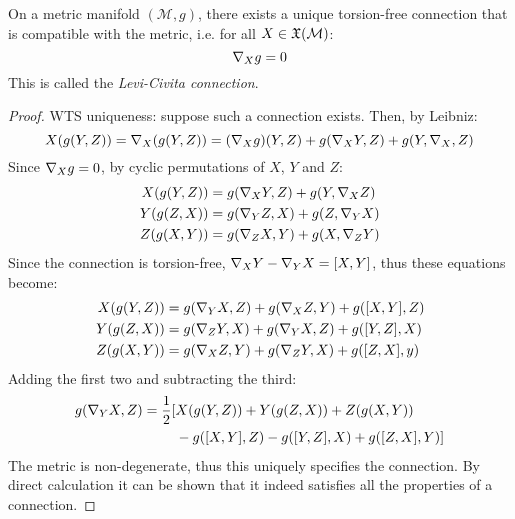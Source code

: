 \begin{theorem}[Riemann]
  On a metric manifold $ (\mathcal{M},g) $, there exists a unique torsion-free connection that is compatible with the metric, i.e. for all $ X \in \mathfrak{X}(\mathcal{M}) $:
  \begin{equation}
    \nabla_X g = 0
    \label{eq:3.39}
  \end{equation}
  This is called the \textit{Levi-Civita connection}.
\end{theorem}
\begin{proof}
  WTS uniqueness: suppose such a connection exists. Then, by Leibniz:
  \begin{equation*}
    X(g(Y,Z)) = \nabla_X (g(Y,Z)) = (\nabla_X g)(Y,Z) + g(\nabla_X Y, Z) + g(Y, \nabla_X, Z)
  \end{equation*}
  Since $ \nabla_X g = 0 $, by cyclic permutations of $ X $, $ Y $ and $ Z $:
  \begin{equation*}
    \begin{split}
      X(g(Y,Z)) &= g(\nabla_X Y, Z) + g(Y, \nabla_X Z) \\
      Y(g(Z,X)) &= g(\nabla_Y Z, X) + g(Z, \nabla_Y X) \\
      Z(g(X,Y)) &= g(\nabla_Z X, Y) + g(X, \nabla_Z Y)
    \end{split}
  \end{equation*}
  Since the connection is torsion-free, $ \nabla_X Y - \nabla_Y X = [X,Y] $, thus these equations become:
  \begin{equation*}
    \begin{split}
      X(g(Y,Z)) &= g(\nabla_Y X, Z) + g(\nabla_X Z, Y) + g([X,Y], Z) \\
      Y(g(Z,X)) &= g(\nabla_Z Y, X) + g(\nabla_Y X, Z) + g([Y,Z], X) \\
      Z(g(X,Y)) &= g(\nabla_X Z, Y) + g(\nabla_Z Y, X) + g([Z,X], y)
    \end{split}
  \end{equation*}
  Adding the first two and subtracting the third:
  \begin{equation*}
    \begin{split}
      g(\nabla_Y X, Z) = \frac{1}{2} [ &X(g(Y,Z)) + Y(g(Z,X)) + Z(g(X,Y)) \\
                                         &- g([X,Y],Z) - g([Y,Z],X) + g([Z,X],Y) ]
    \end{split}
  \end{equation*}
  The metric is non-degenerate, thus this uniquely specifies the connection. By direct calculation it can be shown that it indeed satisfies all the properties of a connection.
\end{proof}

